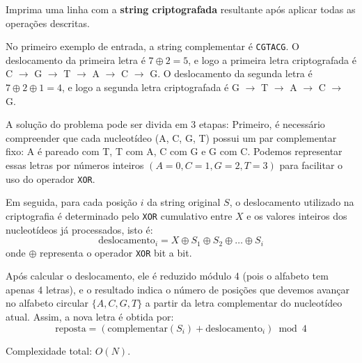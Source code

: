 Imprima uma linha com a \textbf{string criptografada} resultante após aplicar todas as operações descritas.
\vspace{-0.7cm}

No primeiro exemplo de entrada, a string complementar é \texttt{CGTACG}. O deslocamento da primeira letra é $7 \oplus 2 = 5$, e logo a primeira letra criptografada é C $\rightarrow$ G $\rightarrow$ T $\rightarrow$ A $\rightarrow$ C $\rightarrow$ G.  O deslocamento da segunda letra é $7 \oplus 2 \oplus 1 = 4$, e logo a segunda letra criptografada é G $\rightarrow$ T $\rightarrow$ A $\rightarrow$ C $\rightarrow$ G.

A solução do problema pode ser divida em 3 etapas:
Primeiro, é necessário compreender que cada nucleotídeo (A, C, G, T) possui um par complementar fixo: A é pareado com T, T com A, C com G e G com C. Podemos representar essas letras por números inteiros \((A=0, C=1, G=2, T=3)\) para facilitar o uso do operador \texttt{XOR}.  

Em seguida, para cada posição \(i\) da string original \(S\), o deslocamento utilizado na criptografia é determinado pelo \texttt{XOR} cumulativo entre \(X\) e os valores inteiros dos nucleotídeos já processados, isto é:
\[
\text{deslocamento}_i = X \oplus S_1 \oplus S_2 \oplus \ldots \oplus S_i
\]
onde \(\oplus\) representa o operador \texttt{XOR} bit a bit.  

Após calcular o deslocamento, ele é reduzido módulo 4 (pois o alfabeto tem apenas 4 letras), e o resultado indica o número de posições que devemos avançar no alfabeto circular \(\{A, C, G, T\}\) a partir da letra complementar do nucleotídeo atual. Assim, a nova letra é obtida por:
\[
\text{reposta} = (\text{complementar}(S_i) + \text{deslocamento}_i) \bmod 4
\]

Complexidade total: $O(N)$.
